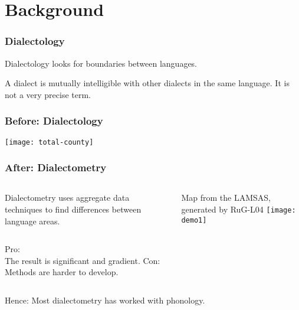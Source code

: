 \documentclass{beamer}
\begin{document}
\section{Background}
\begin{frame}
  \frametitle{Dialectology}
  \begin{definition}
    Dialectology looks for boundaries between languages.
  \end{definition}
  \begin{definition}
    A dialect is mutually intelligible with other dialects in the same
    language. It is not a very precise term.
  \end{definition}

\end{frame}
\begin{frame}
  \frametitle{Before: Dialectology}
  \texttt{[image: total-county]}
\end{frame}
\begin{frame}
  \frametitle{After: Dialectometry}
\begin{columns}

  \begin{definition}
    Dialectometry uses aggregate data techniques to find differences
    between language areas.
  \end{definition}
  Map from the LAMSAS, generated by RuG-L04
  \texttt{[image: demo1]}
\end{columns}
\end{frame}
\begin{frame}
\begin{columns}
Pro:\\
  The result is significant and gradient.
Con: \\
  Methods are harder to develop.
\end{columns}
\vspace{2cm}
Hence: Most dialectometry has worked with phonology.
\end{frame}
\end{document}
